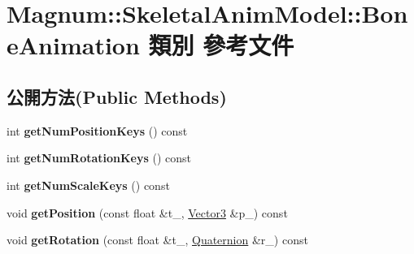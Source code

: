\hypertarget{class_magnum_1_1_skeletal_anim_model_1_1_bone_animation}{}\section{Magnum\+:\+:Skeletal\+Anim\+Model\+:\+:Bone\+Animation 類別 參考文件}
\label{class_magnum_1_1_skeletal_anim_model_1_1_bone_animation}
\subsection*{公開方法(Public Methods)}
\begin{DoxyCompactItemize}
\item 
int {\bfseries get\+Num\+Position\+Keys} () const \hypertarget{class_magnum_1_1_skeletal_anim_model_1_1_bone_animation_a898a03e320e7137f75bab9e83cb63352}{}\label{class_magnum_1_1_skeletal_anim_model_1_1_bone_animation_a898a03e320e7137f75bab9e83cb63352}

\item 
int {\bfseries get\+Num\+Rotation\+Keys} () const \hypertarget{class_magnum_1_1_skeletal_anim_model_1_1_bone_animation_a9183b8325d4c41a128c1725fbe9182de}{}\label{class_magnum_1_1_skeletal_anim_model_1_1_bone_animation_a9183b8325d4c41a128c1725fbe9182de}

\item 
int {\bfseries get\+Num\+Scale\+Keys} () const \hypertarget{class_magnum_1_1_skeletal_anim_model_1_1_bone_animation_a67c0a528e49114cffef8b40846323a10}{}\label{class_magnum_1_1_skeletal_anim_model_1_1_bone_animation_a67c0a528e49114cffef8b40846323a10}

\item 
void {\bfseries get\+Position} (const float \&t\+\_\+, \hyperlink{class_magnum_1_1_vector3}{Vector3} \&p\+\_\+) const \hypertarget{class_magnum_1_1_skeletal_anim_model_1_1_bone_animation_af53a6b73d38cee3e38917eb554ee5e19}{}\label{class_magnum_1_1_skeletal_anim_model_1_1_bone_animation_af53a6b73d38cee3e38917eb554ee5e19}

\item 
void {\bfseries get\+Rotation} (const float \&t\+\_\+, \hyperlink{class_magnum_1_1_quaternion}{Quaternion} \&r\+\_\+) const \hypertarget{class_magnum_1_1_skeletal_anim_model_1_1_bone_animation_acc02315de7b31edac1f504c2c1ae5be1}{}\label{class_magnum_1_1_skeletal_anim_model_1_1_bone_animation_acc02315de7b31edac1f504c2c1ae5be1}


\end{DoxyCompactItemize}
